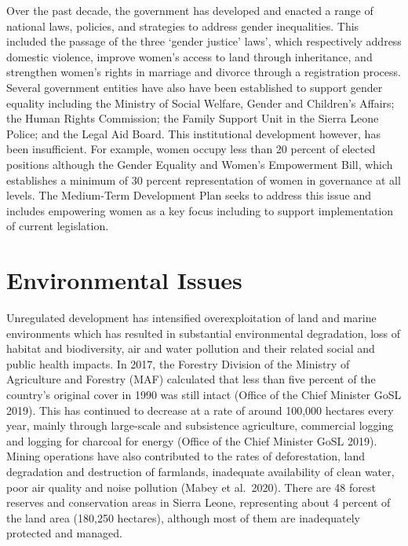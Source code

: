 \documentclass[
]{book}
\begin{document}
Over the past decade, the government has developed and enacted a range of national laws, policies, and strategies to address gender inequalities. This included the passage of the three `gender justice' laws', which respectively address domestic violence, improve women's access to land through inheritance, and strengthen women's rights in marriage and divorce through a registration process. Several government entities have also have been established to support gender equality including the Ministry of Social Welfare, Gender and Children's Affairs; the Human Rights Commission; the Family Support Unit in the Sierra Leone Police; and the Legal Aid Board. This institutional development however, has been insufficient. For example, women occupy less than 20 percent of elected positions although the Gender Equality and Women's Empowerment Bill, which establishes a minimum of 30 percent representation of women in governance at all levels. The Medium-Term Development Plan seeks to address this issue and includes empowering women as a key focus including to support implementation of current legislation.

\hypertarget{environmental-issues}{%
\section{Environmental Issues}\label{environmental-issues}}

Unregulated development has intensified overexploitation of land and marine environments which has resulted in substantial environmental degradation, loss of habitat and biodiversity, air and water pollution and their related social and public health impacts. In 2017, the Forestry Division of the Ministry of Agriculture and Forestry (MAF) calculated that less than five percent of the country's original cover in 1990 was still intact (Office of the Chief Minister GoSL 2019). This has continued to decrease at a rate of around 100,000 hectares every year, mainly through large-scale and subsistence agriculture, commercial logging and logging for charcoal for energy (Office of the Chief Minister GoSL 2019). Mining operations have also contributed to the rates of deforestation, land degradation and destruction of farmlands, inadequate availability of clean water, poor air quality and noise pollution (Mabey et al.~2020). There are 48 forest reserves and conservation areas in Sierra Leone, representing about 4 percent of the land area (180,250 hectares), although most of them are inadequately protected and managed.
\end{document}
